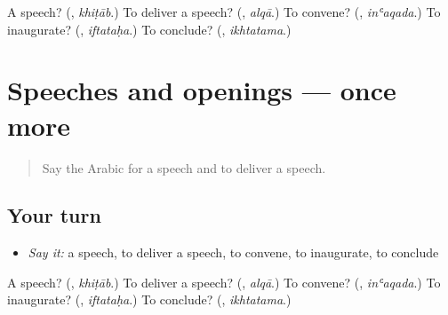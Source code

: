 \begin{tcolorbox}[breakable,colback=teal!4,colframe=teal!35!black,title={Before you move on}]
A speech? (\textbf{}, \emph{khiṭāb}.) To deliver a speech? (\textbf{}, \emph{alqā}.) To convene? (\textbf{}, \emph{inʿaqada}.) To inaugurate? (\textbf{}, \emph{iftataḥa}.) To conclude? (\textbf{}, \emph{ikhtatama}.)
\end{tcolorbox}
\section[(dialogue)]{Speeches and openings — once more}

\label{lesson:AR-R357-review-final-357}



\begin{quote}
Say the Arabic for a speech and to deliver a speech.
\end{quote}

\subsection*{Your turn}
\begin{itemize}
\raggedright
  \item \emph{Say it:} a speech, to deliver a speech, to convene, to inaugurate, to conclude
\end{itemize}

\begin{tcolorbox}[breakable,colback=teal!4,colframe=teal!35!black,title={Before you move on}]
A speech? (\textbf{}, \emph{khiṭāb}.) To deliver a speech? (\textbf{}, \emph{alqā}.) To convene? (\textbf{}, \emph{inʿaqada}.) To inaugurate? (\textbf{}, \emph{iftataḥa}.) To conclude? (\textbf{}, \emph{ikhtatama}.)
\end{tcolorbox}
